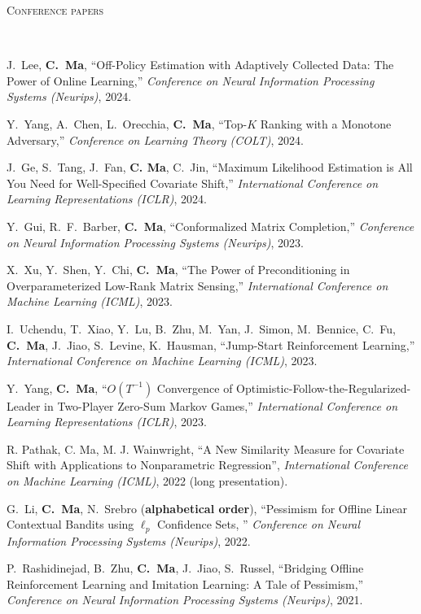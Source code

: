 \documentclass[a4paper, 10pt]{article}
\newenvironment{changemargin}[2]{%
  \begin{list}{}{%
    \setlength{\topsep}{0pt}%
    \setlength{\leftmargin}{#1}%
    \setlength{\rightmargin}{#2}%
    \setlength{\listparindent}{\parindent}%
    \setlength{\itemindent}{\parindent}%
    \setlength{\parsep}{\parskip}%
  }%
  \item[]}{\end{list}
}
\newcommand{\lineover}{
	\begin{changemargin}{-0.05in}{-0.05in}
		\vspace*{-8pt}
		\hrulefill \\
		\vspace*{-2pt}
	\end{changemargin}
}
\newcommand{\header}[1]{
	\begin{changemargin}{-0.5in}{-0.5in}
		\scshape{#1}\\
  	\lineover
	\end{changemargin}
}
\newenvironment{body} {
	\vspace*{-16pt}
	\begin{changemargin}{-0.3in}{-0.5in}
  }	
	{\end{changemargin}
}
\begin{document}
\bigskip
\header{\LARGE{Conference papers}}
\begin{body}
	\vspace{18pt}
	\begin{enumerate}[label={[{C}{{\arabic*}}]}]
	
	\item  J.~Lee, \textbf{C.~Ma}, ``Off-Policy Estimation with Adaptively Collected Data: The Power of Online Learning,'' \emph{Conference on Neural Information Processing Systems (Neurips)}, 2024.
	
	\item Y.~Yang, A.~Chen, L.~Orecchia, \textbf{C.~Ma}, ``Top-$K$ Ranking with a Monotone Adversary,'' \emph{Conference on Learning Theory (COLT)}, 2024.	
	
	\item J.~Ge, S.~Tang, J.~Fan, \textbf{C. Ma}, C.~Jin, ``Maximum Likelihood Estimation is All You Need for Well-Specified Covariate Shift,'' \emph{International Conference on Learning Representations (ICLR)}, 2024.
	\item Y.~Gui, R.~F.~Barber, \textbf{C.~Ma}, ``Conformalized Matrix Completion,'' \emph{Conference on Neural Information Processing Systems (Neurips)}, 2023.
	
	\item X.~Xu, Y.~Shen, Y.~Chi, \textbf{C.~Ma}, ``The Power of Preconditioning in Overparameterized Low-Rank Matrix Sensing,'' \emph{International Conference on Machine Learning (ICML)}, 2023.
	

	
	\item I.~Uchendu, T.~Xiao, Y.~Lu, B.~Zhu, M.~Yan, J.~Simon, M.~Bennice, C.~Fu, \textbf{C.~Ma}, J.~Jiao, S.~Levine, K.~Hausman, ``Jump-Start Reinforcement Learning,'' \emph{International Conference on Machine Learning (ICML)}, 2023.
	
		\item Y.~Yang, \textbf{C.~Ma}, {``$O(T^{-1})$ Convergence of Optimistic-Follow-the-Regularized-Leader in Two-Player Zero-Sum Markov Games,''} \emph{International Conference on Learning Representations (ICLR)}, 2023. \\
	
	\item R. Pathak, C. Ma, M. J. Wainwright, {``A New Similarity Measure for Covariate Shift with Applications to Nonparametric Regression''}, \emph{International Conference on Machine Learning (ICML)}, 2022 (long presentation).
	
	\item G.~Li, \textbf{C.~Ma}, N.~Srebro (\textbf{alphabetical order}), {``Pessimism for Offline Linear Contextual Bandits using $\ell_p$ Confidence Sets, ''} \emph{Conference on Neural Information Processing Systems (Neurips)}, 2022.
	\item P.~Rashidinejad, B.~Zhu, \textbf{C.~Ma}, J.~Jiao, S.~Russel, {``Bridging Offline Reinforcement Learning and Imitation Learning: A Tale of Pessimism,''} \emph{Conference on Neural Information Processing Systems (Neurips)}, 2021. \\
	

\end{enumerate}
\end{body}
\end{document}
